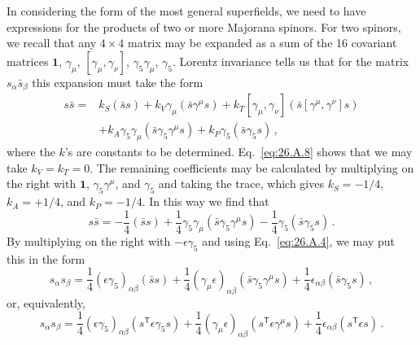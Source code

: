 In considering the form of the most general superfields, we need to have
expressions for the products of two or more Majorana spinors. For two
spinors, we recall that any $4\times4$ matrix may be expanded as a sum of the
16 covariant matrices $\mathbf{1}$, $\gamma_\mu$, $[\gamma_\mu,\gamma_\nu]$,
$\gamma_5\gamma_\mu$, $\gamma_5$. Lorentz invariance tells us that for the
matrix $s_\alpha\bar{s}_\beta$ this expansion must take the form
\[
\begin{aligned}
  s\bar{s}
  ={}&k_S(\bar{s}s)
     +k_V\gamma_\mu(\bar{s}\gamma^\mu s)
     +k_T[\gamma_\mu,\gamma_\nu]
       (\bar{s}[\gamma^\mu,\gamma^\nu]s)
  \\
  &+k_A\gamma_5\gamma_\mu(\bar{s}\gamma_5\gamma^\mu s)
    +k_P\gamma_5(\bar{s}\gamma_5s)\,,
\end{aligned}
\]
where the $k$'s are constants to be determined. Eq.~\eqref{eq:26.A.8} shows
that we may take $k_V=k_T=0$. The remaining coefficients may be calculated
by multiplying on the right with $\mathbf{1}$, $\gamma_5\gamma^\mu$, and
$\gamma_5$ and taking the trace, which gives $k_S=-1/4$, $k_A=+1/4$, and
$k_P=-1/4$. In this way we find that
\begin{equation}
  s\bar{s}
  =-\frac14(\bar{s}s)
   +\frac14\gamma_5\gamma_\mu(\bar{s}\gamma_5\gamma^\mu s)
   -\frac14\gamma_5(\bar{s}\gamma_5s)\,.
  \tag{26.A.9}\label{eq:26.A.9}
\end{equation}
By multiplying on the right with $-\epsilon\gamma_5$ and using
Eq.~\eqref{eq:26.A.4}, we may put this in the form
\begin{equation}
  s_\alpha s_\beta
  =\frac14(\epsilon\gamma_5)_{\alpha\beta}(\bar{s}s)
   +\frac14(\gamma_\mu\epsilon)_{\alpha\beta}
     (\bar{s}\gamma_5\gamma^\mu s)
   +\frac14\epsilon_{\alpha\beta}(\bar{s}\gamma_5s)\,,
  \tag{26.A.10}\label{eq:26.A.10}
\end{equation}
or, equivalently,
\begin{equation}
  s_\alpha s_\beta
  =\frac14(\epsilon\gamma_5)_{\alpha\beta}
     (s^{\mathsf T}\epsilon\gamma_5s)
   +\frac14(\gamma_\mu\epsilon)_{\alpha\beta}
     (s^{\mathsf T}\epsilon\gamma^\mu s)
   +\frac14\epsilon_{\alpha\beta}(s^{\mathsf T}\epsilon s)\,.
  \tag{26.A.11}\label{eq:26.A.11}
\end{equation}

